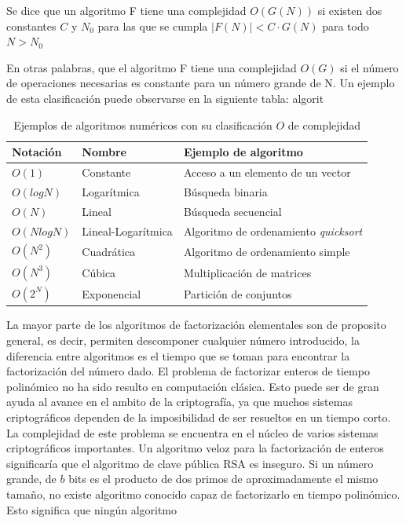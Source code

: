 \begin{defi}
Se dice que un algoritmo F tiene una complejidad $O(G(N))$ si existen dos constantes $C$ y $N_0$ para las que se cumpla $|F(N)|<C\cdot G(N)$ para todo
$N>N_0$
\end{defi}
En otras palabras, que el algoritmo F tiene una complejidad $O(G)$ si el número de operaciones necesarias es constante para un número grande de N. Un ejemplo
de esta clasificación puede observarse en la siguiente tabla: algorit
\begin{table}[H]
    \centering
    \begin{tabular}{lll}
        \hline
        Notación & Nombre & Ejemplo de algoritmo \\
        \hline
        $O(1)$ & Constante & Acceso a un elemento de un vector\\ 
        $O(log N)$ & Logarítmica& Búsqueda binaria\\
        $O(N)$ & Lineal & Búsqueda secuencial\\
        $O(N log N)$ & Lineal-Logarítmica& Algoritmo de ordenamiento \textit{quicksort}\\
        $O(N^2)$ &Cuadrática & Algoritmo de ordenamiento simple\\
        $O(N^3)$ &Cúbica & Multiplicación de matrices\\
        $O(2^N)$ &Exponencial & Partición de conjuntos\\ \hline
    \end{tabular}
    \caption{Ejemplos de algoritmos numéricos con su clasificación $O$ de complejidad}
    \label{tabla:notacion-O}
\end{table}
La mayor parte de los algoritmos de factorización elementales son de proposito general, es decir, permiten descomponer cualquier
número introducido, la diferencia entre algoritmos es el tiempo que se toman para encontrar la factorización del número dado. El problema de 
factorizar enteros de tiempo polinómico no ha sido resulto en computación clásica. Esto puede ser de gran ayuda al avance en el ambito de la 
criptografía, ya que muchos sistemas criptográficos dependen de la imposibilidad de ser resueltos en un tiempo corto. La complejidad de este problema se encuentra en el núcleo de varios sistemas criptográficos importantes. Un algoritmo veloz para la factorización
de enteros significaría que el algoritmo de clave pública RSA es inseguro. Si un número grande, de $b$ bits es el producto de dos primos
de aproximadamente el mismo tamaño, no existe algoritmo conocido capaz de factorizarlo en tiempo polinómico. Esto significa que ningún algoritmo
